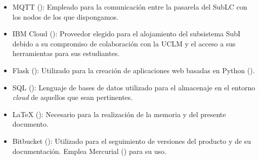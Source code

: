 \begin{itemize}
    \item MQTT (\cite{ibm.mqtt.01}): Empleado para la comunicación entre la pasarela del SubLC con los nodos de los que dispongamos.
    \item IBM Cloud (\cite{ibm.cloud.01}): Proveedor elegido para el alojamiento del subsistema SubI debido a su compromiso de colaboración con la UCLM y el acceso a sus herramientas para sus estudiantes.
    \item Flask (\cite{flask.01}): Utilizado para la creación de aplicaciones web basadas en Python (\cite{python.01}).
    \item SQL (\cite{sql.01}): Lenguaje de bases de datos utilizado para el almacenaje en el entorno \textit{cloud} de aquellos que sean pertinentes.
    \item LaTeX (\cite{latex.01}): Necesario para la realización de la memoria y del presente documento.
    \item Bitbucket (\cite{bitbucket.01}): Utilizado para el seguimiento de versiones del producto y de su documentación. Emplea Mercurial (\cite{mercurial.01}) para su uso.
    
\end{itemize}